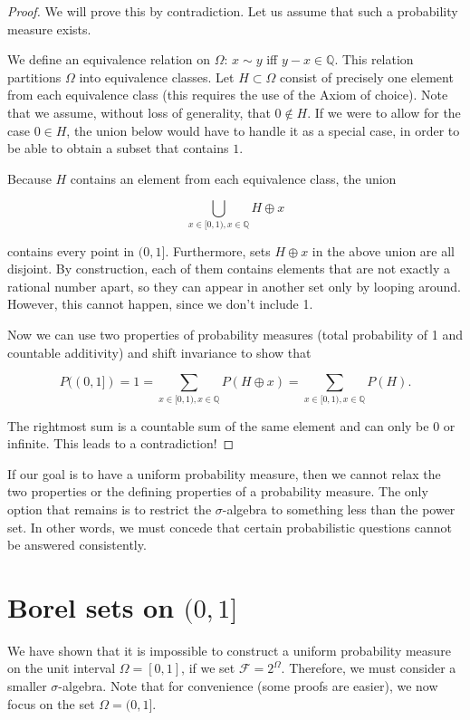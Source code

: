 \documentclass{book}
\theoremstyle{plain}%
\theoremstyle{definition}
\begin{document}
\begin{proof}
We will prove this by contradiction. Let us assume that such a probability measure exists.

We define an equivalence relation on $\Omega$: $x \sim y$ iff $y - x \in \mathbb{Q}$. This relation partitions $\Omega$ into equivalence classes. Let $H \subset \Omega$ consist of precisely one element from each equivalence class (this requires the use of the Axiom of choice). Note that we assume, without loss of generality, that $0 \notin H$. If we were to allow for the case $0 \in H$, the union below would have to handle it as a special case, in order to be able to obtain a subset that contains $1$.

Because $H$ contains an element from each equivalence class, the union 

$$\displaystyle \bigcup_{x \in [0, 1), x \in \mathbb{Q}} H \oplus x$$
  
contains every point in $(0,1]$. Furthermore, sets $H \oplus x$ in the above union are all disjoint. By construction, each of them contains elements that are not exactly a rational number apart, so they can appear in another set only by looping around. However, this cannot happen, since we don't include 1.

Now we can use two properties of probability measures (total probability of 1 and countable additivity) and shift invariance to show that

$$P((0,1]) = 1 = \displaystyle \sum_{x \in [0, 1), x \in \mathbb{Q}} P(H \oplus x) = \displaystyle \sum_{x \in [0, 1), x \in \mathbb{Q}} P(H).$$
  
The rightmost sum is a countable sum of the same element and can only be 0 or infinite. This leads to a contradiction!
\end{proof}

If our goal is to have a uniform probability measure, then we cannot relax the two properties or the defining properties of a probability measure. The only option that remains is to restrict the $\sigma$-algebra to something less than the power set. In other words, we must concede that certain probabilistic questions cannot be answered consistently.

\section{Borel sets on $(0,1]$}

We have shown that it is impossible to construct a uniform probability measure on the unit interval $\Omega = [0, 1]$, if we set $\mathcal{F} = 2^\Omega$. Therefore, we must consider a smaller $\sigma$-algebra. Note that for convenience (some proofs are easier), we now focus on the set $\Omega = (0, 1]$.
\end{document}
